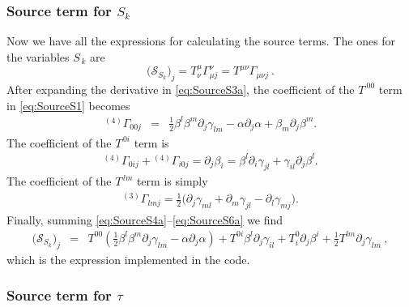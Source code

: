 \documentclass{article}
\begin{document}
\subsubsection{Source term for $S_k$}
Now we have all the expressions for calculating the source terms. The
ones for the variables $S_{\,k}$ are
%
\begin{equation}
  \label{eq:SourceS1}
  \big({\mathcal S}_{S_k}\big)_j = T^\mu_\nu \Gamma^\nu_{\mu j} = T^{\mu\nu} \Gamma_{\mu\nu j}\ .
\end{equation}
%
After expanding the derivative in
\eqref{eq:SourceS3a}, the coefficient of the $T^{\ 00}$ term in
\eqref{eq:SourceS1} becomes
%
\begin{eqnarray}
  \label{eq:SourceS4a}
  {}^{(4)}\Gamma_{00j} & = & \frac{1}{2} \beta^l \beta^m \partial_j
  \gamma_{lm} - \alpha \partial_j \alpha + \beta_m \partial_j \beta^m.
\end{eqnarray}
%
The coefficient of the $T^{\,0i}$ term 
is
%
\begin{eqnarray}
  \label{eq:SourceS5a}
  {}^{(4)}\Gamma_{0ij} + {}^{(4)}\Gamma_{i0j} = \partial_j\beta_i = \beta^l \partial_i
  \gamma_{jl} + \gamma_{il} \partial_j \beta^l.
\end{eqnarray}
%
The coefficient of the $T^{\,lm}$ term is simply
%
\begin{eqnarray}
  \label{eq:SourceS6a} 
{}^{(3)}\Gamma_{lmj} =
  \frac{1}{2} \Big (\partial_j\gamma_{ml} + \partial_m\gamma_{jl} - \partial_l\gamma_{mj} \Big).
\end{eqnarray}
%
Finally, summing \eqref{eq:SourceS4a}--\eqref{eq:SourceS6a} we
find
%
\begin{eqnarray}
  \label{eq:SourceS2a} 
\big({\mathcal S}_{S_k}\big)_j & = &
  T^{00}\left( \frac{1}{2} \beta^l \beta^m \partial_j \gamma_{lm} -
  \alpha \partial_j \alpha \right) + T^{0i} \beta^l \partial_j
  \gamma_{il} + T^0_i\partial_j \beta^i + \frac{1}{2} T^{lm}
  \partial_j \gamma_{lm} \ ,
\end{eqnarray}
%
which is the expression implemented in the code. 

\subsubsection{Source term for $\tau$}
\end{document}
